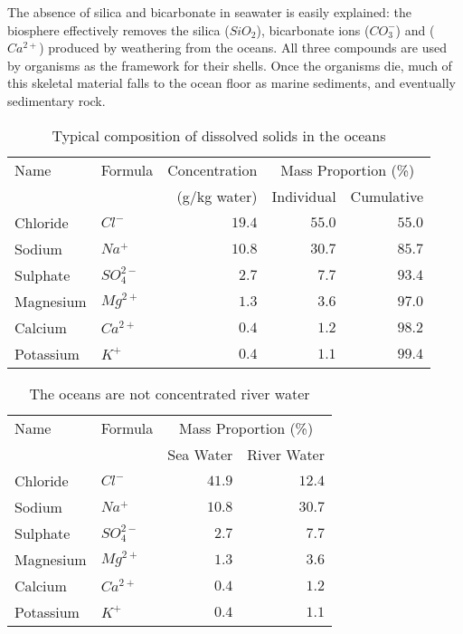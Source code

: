 \documentclass[amstex,12pt]{book}
\begin{document}
The absence of silica and bicarbonate in seawater is easily explained: the biosphere effectively removes the silica ($SiO_2$), bicarbonate ions ($CO_3^-$) and ($Ca^{2+}$) produced by weathering from the oceans. All three compounds are used by organisms as the framework for their shells. Once the organisms die, much of this skeletal material falls to the ocean floor as marine sediments, and eventually sedimentary rock.\\
\begin{table} 
\centering
\caption{Typical composition of dissolved solids in the oceans}
\label{tab:salinity}
\begin{tabular}{@{}llrrr@{}} \toprule
Name      & Formula			&Concentration  & \multicolumn{2}{c}{Mass Proportion (\%)}\\ \cmidrule(r){4-5}
					&	             & (g/kg water)& Individual            &Cumulative 		\\  \midrule
Chloride	&$Cl^-$        &$ 19.4$	&$ 55.0$	&$55.0$\\
Sodium    &$Na^+$        &$ 10.8$	&$ 30.7$	&$85.7$\\
Sulphate  &$SO_{4}^{2-}$ &$  2.7$ &$  7.7$	&$93.4$\\
Magnesium	&$Mg^{2+}    $ &$  1.3$ &$  3.6$  &$97.0$\\
Calcium   &$Ca^{2+}$     &$  0.4$ &$  1.2$  &$98.2$\\
Potassium &$K^+$         &$  0.4$ &$  1.1$  &$99.4$\\ \bottomrule
\end{tabular}

\end{table}

\begin{table} 
\centering
\caption{The oceans are not concentrated river water}
\label{tab:river_ocean_comp}
\begin{tabular}{@{}llrr@{}} \toprule
Name      & Formula			 & \multicolumn{2}{c}{Mass Proportion (\%)}\\ \cmidrule(r){3-4}
					&	             & Sea Water  & River Water \\  \midrule
Chloride	&$Cl^-$        &$ 41.9$	&$ 12.4$\\
Sodium    &$Na^+$        &$ 10.8$	&$ 30.7$\\
Sulphate  &$SO_{4}^{2-}$ &$  2.7$ &$  7.7$\\
Magnesium	&$Mg^{2+}    $ &$  1.3$ &$  3.6$\\
Calcium   &$Ca^{2+}$     &$  0.4$ &$  1.2$\\
Potassium &$K^+$         &$  0.4$ &$  1.1$\\ \bottomrule
\end{tabular}
\end{table}
\end{document}
